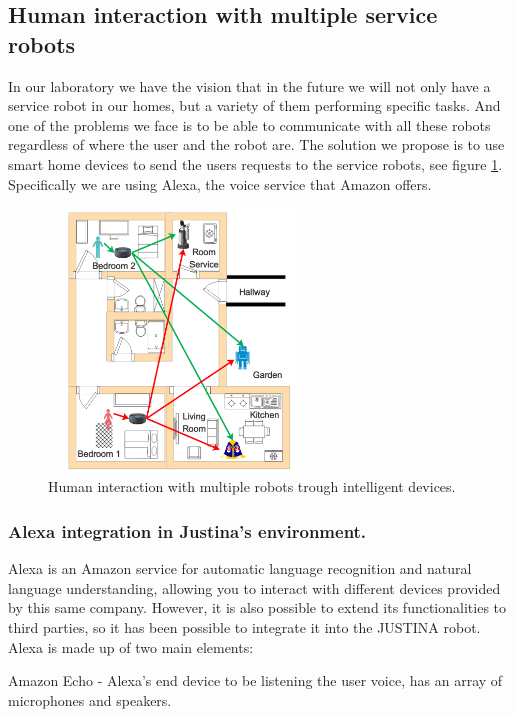 \documentclass{llncs}
\begin{document}
\subsection{Human interaction with multiple service robots}\label{subsec:Alexa}

In our laboratory we have the vision that in the future we will not only have a service robot in our homes, 
but a variety of them performing specific tasks. 
And one of the problems we face is to be able to communicate with all these robots regardless of where the user and the robot are.
The solution we propose is to use smart home devices to send the users requests to the service robots, see figure \ref{fig:alexahome}. 
Specifically we are using Alexa, 
the voice service that Amazon offers.

\begin{figure}[h]
	\centering
	\includegraphics[angle=0, height=7cm, width=7cm]{Figures/alexa1.png}
	\caption{Human interaction with multiple robots trough intelligent devices.}
	\label{fig:alexahome}
\end{figure}

\subsubsection{Alexa integration in Justina's environment.} Alexa is an Amazon service for automatic language recognition and natural language understanding, allowing you to interact with different devices provided by this same company. However, it is also possible to extend its functionalities to third parties, so it has been possible to integrate it into the JUSTINA robot. Alexa is made up of two main elements:
\vspace{.01 in}

	Amazon Echo - Alexa's end device to be listening the user voice, has an array of microphones and speakers.
\vspace{.01 in}
\end{document}
